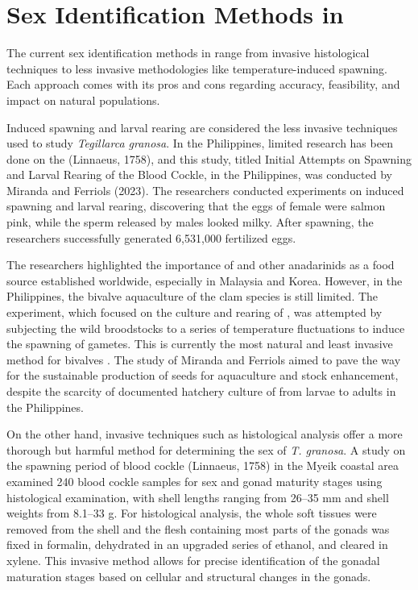 \section{Sex Identification Methods in \Tgranosa}

The current sex identification methods in \Tegillarcagranosa range from invasive histological techniques to less invasive methodologies like temperature-induced spawning. Each approach comes with its pros and cons regarding accuracy, feasibility, and impact on natural populations.

Induced spawning and larval rearing are considered the less invasive techniques used to study \textit{Tegillarca granosa}. In the Philippines, limited research has been done on the \Tegillarcagranosa (Linnaeus, 1758), and this study, titled Initial Attempts on Spawning and Larval Rearing of the Blood Cockle, \Tegillarcagranosa in the Philippines, was conducted by Miranda and Ferriols (2023). The researchers conducted experiments on induced spawning and larval rearing, discovering that the eggs of female \Tgranosa were salmon pink, while the sperm released by males looked milky. After spawning, the researchers successfully generated 6,531,000 fertilized eggs.

The researchers highlighted the importance of \Tgranosa and other anadarinids as a food source established worldwide, especially in Malaysia and Korea. However, in the Philippines, the bivalve aquaculture of the clam species is still limited. The experiment, which focused on the culture and rearing of \Tgranosa, was attempted by subjecting the wild broodstocks to a series of temperature fluctuations to induce the spawning of gametes. This is currently the most natural and least invasive method for bivalves \cite{aji}. The study of Miranda and Ferriols aimed to pave the way for the sustainable production of \Tgranosa seeds for aquaculture and stock enhancement, despite the scarcity of documented hatchery culture of \Tgranosa from larvae to adults in the Philippines.

On the other hand, invasive techniques such as histological analysis offer a more thorough but harmful method for determining the sex of \textit{T. granosa}. A study on the spawning period of blood cockle \Tegillarcagranosa (Linnaeus, 1758) in the Myeik coastal area examined 240 blood cockle samples for sex and gonad maturity stages using histological examination, with shell lengths ranging from 26–35 mm and shell weights from 8.1–33 g. For histological analysis, the whole soft tissues were removed from the shell and the flesh containing most parts of the gonads was fixed in formalin, dehydrated in an upgraded series of ethanol, and cleared in xylene. This invasive method allows for precise identification of the gonadal maturation stages based on cellular and structural changes in the gonads.

